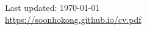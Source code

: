 \documentclass[10pt, letterpaper]{article}
\newcommand{\mysection}[1]{
  \vspace{20pt}\noindent{\rmfamily\mdseries \Large #1}\\
  \vspace{-6pt}\hrule\vspace{3pt}
}
\begin{document}

\vfill
\begin{center}
{\footnotesize
  Last updated: \today \\
  \url{https://soonhokong.github.io/cv.pdf}
}
\end{center}
\end{document}
